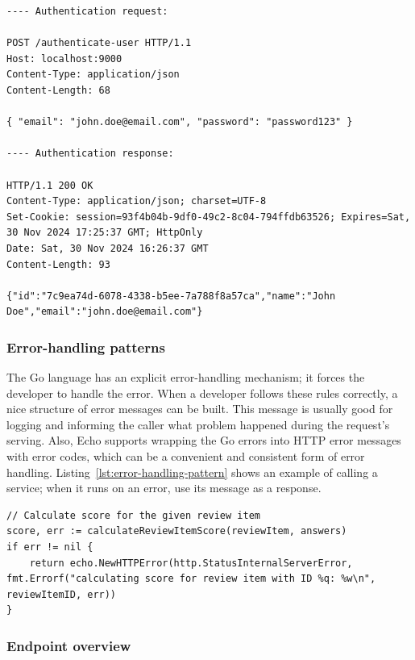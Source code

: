 \begin{lstlisting}[caption=HTTP request and response for authentication,label=lst:http-request-and-response]
---- Authentication request:

POST /authenticate-user HTTP/1.1
Host: localhost:9000
Content-Type: application/json
Content-Length: 68

{ "email": "john.doe@email.com", "password": "password123" }

---- Authentication response:

HTTP/1.1 200 OK
Content-Type: application/json; charset=UTF-8
Set-Cookie: session=93f4b04b-9df0-49c2-8c04-794ffdb63526; Expires=Sat, 30 Nov 2024 17:25:37 GMT; HttpOnly
Date: Sat, 30 Nov 2024 16:26:37 GMT
Content-Length: 93

{"id":"7c9ea74d-6078-4338-b5ee-7a788f8a57ca","name":"John Doe","email":"john.doe@email.com"}
\end{lstlisting}

\subsubsection{Error-handling patterns}

The Go language has an explicit error-handling mechanism; it forces the developer to handle the error. When a developer follows these rules correctly, a nice structure of error messages can be built. This message is usually good for logging and informing the caller what problem happened during the request's serving. Also, Echo supports wrapping the Go errors into HTTP error messages with error codes, which can be a convenient and consistent form of error handling. Listing~\ref{lst:error-handling-pattern} shows an example of calling a service; when it runs on an error, use its message as a response.

\begin{lstlisting}[caption=Error handling using Go errors,label=lst:error-handling-pattern]
// Calculate score for the given review item
score, err := calculateReviewItemScore(reviewItem, answers)
if err != nil {
    return echo.NewHTTPError(http.StatusInternalServerError, fmt.Errorf("calculating score for review item with ID %q: %w\n", reviewItemID, err))
}
\end{lstlisting}

\subsubsection{Endpoint overview}

